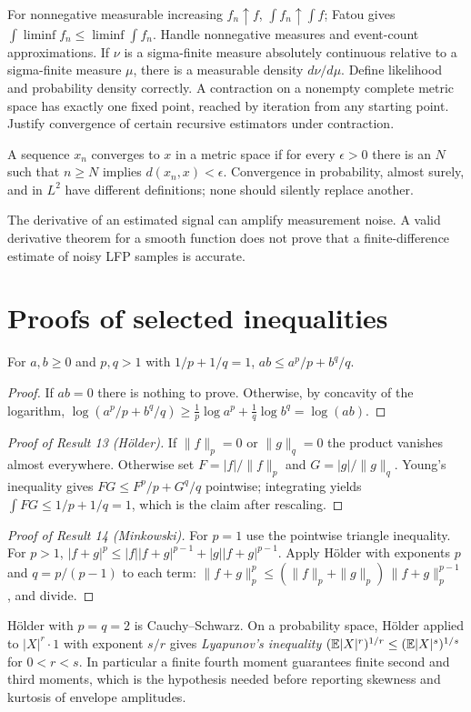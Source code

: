 {For nonnegative measurable increasing $f_n\uparrow f$,
$\int f_n\uparrow\int f$; Fatou gives
$\int\liminf f_n\leq\liminf\int f_n$.}
{Handle nonnegative measures and event-count approximations.}
{If $\nu$ is a sigma-finite measure absolutely continuous
relative to a sigma-finite measure $\mu$, there is a
measurable density $d\nu/d\mu$.}
{Define likelihood and probability density correctly.}
{A contraction on a nonempty complete metric space has exactly
one fixed point, reached by iteration from any starting point.}
{Justify convergence of certain recursive estimators under contraction.}

\begin{definition}
A sequence $x_n$ converges to $x$ in a metric space if
for every $\epsilon>0$ there is an $N$ such that
$n\geq N$ implies $d(x_n,x)<\epsilon$.
Convergence in probability, almost surely, and in $L^2$ have
different definitions; none should silently replace another.
\end{definition}
\begin{caution}
The derivative of an estimated signal can amplify measurement noise.
A valid derivative theorem for a smooth function does not prove that a
finite-difference estimate of noisy LFP samples is accurate.
\end{caution}
\section{Proofs of selected inequalities}
\begin{lemma}
For $a,b\ge0$ and $p,q>1$ with $1/p+1/q=1$, $ab\le a^p/p+b^q/q$.
\end{lemma}
\begin{proof}
If $ab=0$ there is nothing to prove. Otherwise, by concavity of the
logarithm,
$\log(a^p/p+b^q/q)\ge\frac1p\log a^p+\frac1q\log b^q=\log(ab)$.
\end{proof}
\begin{proof}[Proof of Result 13 (H\"older)]
If $\|f\|_p=0$ or $\|g\|_q=0$ the product vanishes almost everywhere.
Otherwise set $F=|f|/\|f\|_p$ and $G=|g|/\|g\|_q$. Young's inequality
gives $FG\le F^p/p+G^q/q$ pointwise; integrating yields
$\int FG\le1/p+1/q=1$, which is the claim after rescaling.
\end{proof}
\begin{proof}[Proof of Result 14 (Minkowski)]
For $p=1$ use the pointwise triangle inequality. For $p>1$,
$|f+g|^p\le|f||f+g|^{p-1}+|g||f+g|^{p-1}$. Apply H\"older with
exponents $p$ and $q=p/(p-1)$ to each term:
$\|f+g\|_p^p\le(\|f\|_p+\|g\|_p)\,\|f+g\|_p^{p-1}$, and divide.
\end{proof}
H\"older with $p=q=2$ is Cauchy--Schwarz. On a probability space,
H\"older applied to $|X|^r\cdot1$ with exponent $s/r$ gives
\emph{Lyapunov's inequality} $(\mathbb{E}|X|^r)^{1/r}\le(\mathbb{E}|X|^s)^{1/s}$ for
$0<r<s$. In particular a finite fourth moment guarantees finite second
and third moments, which is the hypothesis needed before reporting
skewness and kurtosis of envelope amplitudes.

